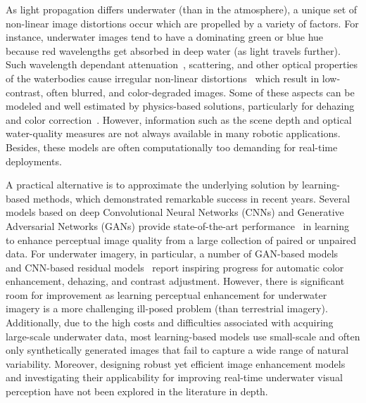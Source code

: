 \documentclass[10pt,twocolumn,letterpaper]{article}
\begin{document}
As light propagation differs underwater (than in the atmosphere), a unique set of non-linear image distortions occur which are propelled by a variety of factors. 
For instance, underwater images tend to have a dominating green or blue hue~\cite{fabbri2018enhancing} because red wavelengths get absorbed in deep water (as light travels further). Such wavelength dependant attenuation~\cite{akkaynak2018revised}, scattering, and other optical properties of the waterbodies cause irregular non-linear distortions~\cite{guo2019underwater,zhang2017underwater} which result in low-contrast, often blurred, and color-degraded images. Some of these aspects can be modeled and well estimated by physics-based solutions, particularly for dehazing and color correction~\cite{bryson2016true,berman2018underwater}. However, information such as the scene depth and optical water-quality measures are not always available in many robotic applications. Besides, these models are often computationally too demanding for real-time deployments.   


A practical alternative is to approximate the underlying solution by learning-based methods, which demonstrated remarkable success in recent years. Several models based on deep Convolutional Neural Networks (CNNs) and Generative Adversarial Networks (GANs) provide state-of-the-art performance~\cite{ignatov2017dslr,chen2018deep,isola2017image,zhu2017unpaired} in learning to enhance perceptual image quality from a large collection of paired or unpaired data. 
For underwater imagery, in particular, a number of GAN-based models~\cite{fabbri2018enhancing,yu2018underwater} and CNN-based residual models~\cite{liu2019underwater} report inspiring progress for automatic color enhancement, dehazing, and contrast adjustment. However, there is significant room for improvement as learning perceptual enhancement for underwater imagery is a more challenging ill-posed problem (than terrestrial imagery).    
Additionally, due to the high costs and difficulties associated with acquiring large-scale underwater data, most learning-based models use small-scale and often only synthetically generated images that fail to capture a wide range of natural variability. 
Moreover, designing robust yet efficient image enhancement models and investigating their applicability for improving real-time underwater visual perception have not been explored in the literature in depth. 
\end{document}
